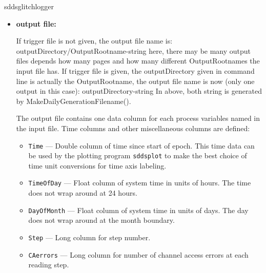 \begin{sddsprog}{sddsglitchlogger}
\begin{itemize}
\item {\bf output file:}\par
If trigger file is not given, the output file name is:
   outputDirectory/OutputRootname-string
   here, there may be many output files depends how many pages and how many different OutputRootnames 
   the input file has.
If trigger file is given, the outputDirectory given in command line is actually the OutputRootname,
the output file name is now (only one output in this case):
   outputDirectory-string
In above, both string is generated by MakeDailyGenerationFilename().

The output file contains one data column for each process variables named in the input file. 
Time columns and other miscellaneous columns are defined: 
\begin{itemize}
        \item {\tt Time} --- Double column of time since start of epoch. This time data can be used by
        the plotting program {\verb+sddsplot+} to make the best choice of time unit conversions
        for time axis labeling.
        \item {\tt TimeOfDay} --- Float column of system time in units of hours. 
        The time does not wrap around at 24 hours.
        \item {\tt DayOfMonth} --- Float column of system time in units of days. 
        The day does not wrap around at the month boundary.
        \item {\tt Step} --- Long column for step number.
        \item {\tt CAerrors} --- Long column for number of channel access errors at each reading step. 
\end{itemize}


\end{itemize}
\end{sddsprog}
